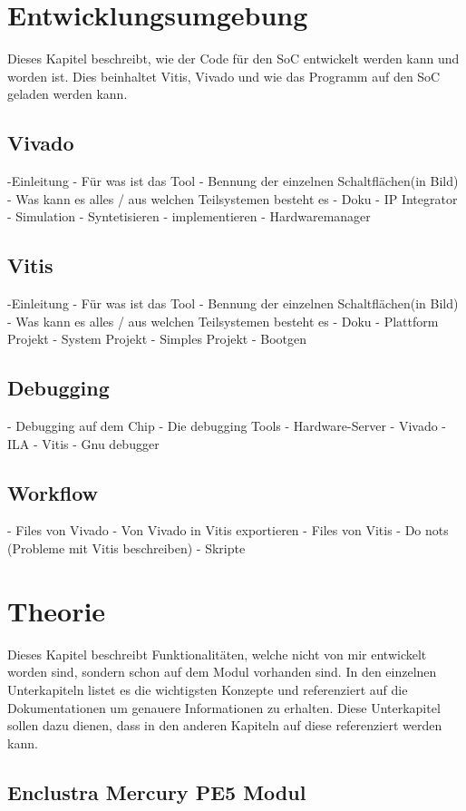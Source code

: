 \documentclass{article}
\begin{document}
\section{Entwicklungsumgebung}
Dieses Kapitel beschreibt, wie der Code für den SoC entwickelt werden kann und worden ist. Dies beinhaltet Vitis, Vivado und wie das Programm auf den SoC geladen werden kann.
\subsection{Vivado}
-Einleitung
    - Für was ist das Tool
    - Bennung der einzelnen Schaltflächen(in Bild)
    - Was kann es alles / aus welchen Teilsystemen besteht es
    - Doku
- IP Integrator
- Simulation
- Syntetisieren
- implementieren
- Hardwaremanager

\subsection{Vitis}
-Einleitung
    - Für was ist das Tool
    - Bennung der einzelnen Schaltflächen(in Bild)
    - Was kann es alles / aus welchen Teilsystemen besteht es
    - Doku
- Plattform Projekt
- System Projekt
- Simples Projekt
- Bootgen

\subsection{Debugging}
- Debugging auf dem Chip
- Die debugging Tools
    - Hardware-Server
    - Vivado
        - ILA
    - Vitis
        - Gnu debugger

\subsection{Workflow}
- Files von Vivado
- Von Vivado in Vitis exportieren
- Files von Vitis
- Do nots (Probleme mit Vitis beschreiben)
- Skripte


\section{Theorie}
Dieses Kapitel beschreibt Funktionalitäten, welche nicht von mir entwickelt worden sind, sondern schon auf dem Modul vorhanden sind. In den einzelnen Unterkapiteln listet es die wichtigsten Konzepte und referenziert auf die Dokumentationen um genauere Informationen zu erhalten. Diese Unterkapitel sollen dazu dienen, dass in den anderen Kapiteln auf diese referenziert werden kann.
\subsection{Enclustra Mercury PE5 Modul}
\end{document}
